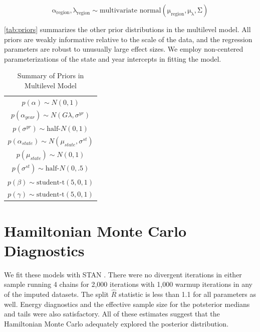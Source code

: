 \documentclass[12pt]{article}
\begin{document}
\begin{equation}
\mathrm{\alpha_{region}, \lambda_{region} \sim \mbox{multivariate normal}(\mu_{region}, \mu_{\lambda}, \Sigma)}
\end{equation}
 

\autoref{tab:priors} summarizes the other prior distributions in the multilevel model. 
All priors are weakly informative relative to the scale of the data, and the regression parameters are robust to unusually large effect sizes. 
We employ non-centered parameterizations of the state and year intercepts in fitting the model. 



\begin{table} %
\begin{center}
\begin{tabular}{c} 
$ p(\alpha) \sim N(0, 1)$  \\
$ p(\alpha_{year}) \sim N(G \lambda, \sigma^{yr}) $ \\ 
$ p(\sigma^{yr}) \sim \mbox{half-}N(0, 1) $ \\
$ p(\alpha_{state}) \sim N(\mu_{state}, \sigma^{st}) $ \\ 
$ p(\mu_{state}) \sim N(0, 1) $ \\ 
$ p(\sigma^{st}) \sim \mbox{half-}N(0, .5) $ \\ 
$ p(\beta) \sim \mbox{student-t}(5, 0, 1) $ \\
$ p(\gamma) \sim \mbox{student-t}(5, 0, 1) $ 
\end{tabular} 
\caption{Summary of Priors in Multilevel Model} 
\label{tab:priors}
\end{center} 
\end{table} 





\section{Hamiltonian Monte Carlo Diagnostics}

We fit these models with STAN \citep{Carpenteretal2016}.
There were no divergent iterations in either sample running 4 chains for 2,000 iterations with 1,000 warmup iterations in any of the imputed datasets.  
The split $\hat{R}$ statistic is less than 1.1 for all parameters as well.
Energy diagnostics and the effective sample size for the potsterior medians and tails were also satisfactory.  
All of these estimates suggest that the Hamiltonian Monte Carlo adequately explored the posterior distribution. 
\end{document}
